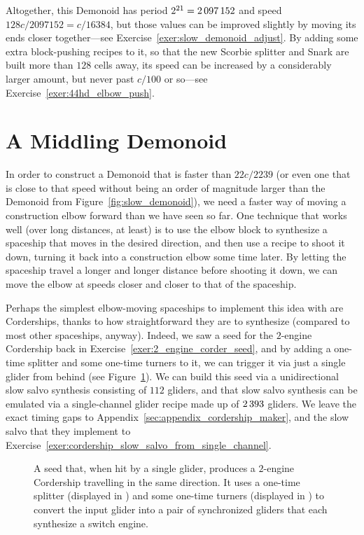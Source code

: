 Altogether, this Demonoid has period $2^{21} = 2{\,}097{\,}152$ and speed $128c/2097152 = c/16384$, but those values can be improved slightly by moving its ends closer together---see Exercise~\ref{exer:slow_demonoid_adjust}. By adding some extra block-pushing recipes to it, so that the new Scorbie splitter and Snark are built more than $128$ cells away, its speed can be increased by a considerably larger amount, but never past $c/100$ or so---see Exercise~\ref{exer:44hd_elbow_push}.


\section{A Middling Demonoid}\label{sec:medium_demonoid}

In order to construct a Demonoid that is faster than $22c/2239$ (or even one that is close to that speed without being an order of magnitude larger than the Demonoid from Figure~\ref{fig:slow_demonoid}), we need a faster way of moving a construction elbow forward than we have seen so far. One technique that works well (over long distances, at least) is to use the elbow block to synthesize a spaceship that moves in the desired direction, and then use a recipe to shoot it down, turning it back into a construction elbow some time later. By letting the spaceship travel a longer and longer distance before shooting it down, we can move the elbow at speeds closer and closer to that of the spaceship.

Perhaps the simplest elbow-moving spaceships to implement this idea with are Corderships, thanks to how straightforward they are to synthesize (compared to most other spaceships, anyway). Indeed, we saw a seed for the $2$-engine Cordership back in Exercise~\ref{exer:2_engine_corder_seed}, and by adding a one-time splitter and some one-time turners to it, we can trigger it via just a single glider from behind (see Figure~\ref{fig:2_engine_cordership_seed}). We can build this seed via a unidirectional slow salvo synthesis consisting of $112$ gliders, and that slow salvo synthesis can be emulated via a single-channel glider recipe made up of $2{\,}393$ gliders. We leave the exact timing gaps to Appendix~\ref{sec:appendix_cordership_maker}, and the slow salvo that they implement to Exercise~\ref{exer:cordership_slow_salvo_from_single_channel}.

\begin{figure}[!htb]
	\centering
	
	\caption{A seed that, when hit by a single glider, produces a $2$-engine Cordership travelling in the same direction. It uses a one-time splitter (displayed in ) and some one-time turners (displayed in ) to convert the input glider into a pair of synchronized gliders that each synthesize a switch engine.}\label{fig:2_engine_cordership_seed}
\end{figure}

